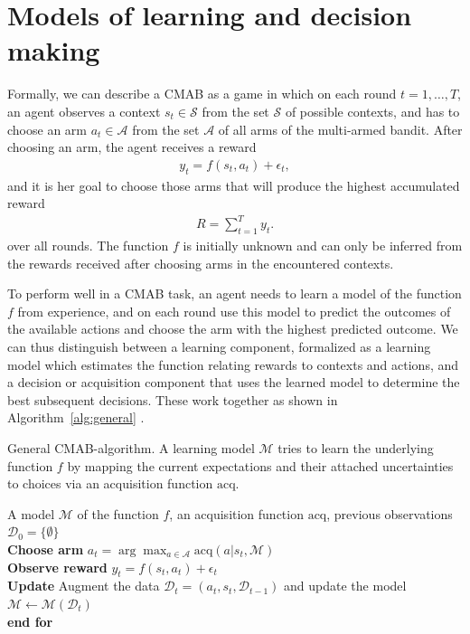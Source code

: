 \documentclass[a4paper,natbib]{apa6}
\begin{document}
\section{Models of learning and decision making}

Formally, we can describe a CMAB as a game in which on each round $t=1,\ldots,T$, an agent observes a context $s_t \in \mathcal{S}$ from the set $\mathcal{S}$ of possible contexts, and has to choose an arm $a_t \in \mathcal{A}$ from the set $\mathcal{A}$ of all arms of the multi-armed bandit. After choosing an arm, the agent receives a reward 
\begin{align}
y_t=f(s_t,a_t)+\epsilon_t ,
\end{align}
and it is her goal to choose those arms that will produce the highest accumulated reward 
\begin{align}
R = \sum_{t=1}^T y_t .
\end{align}
over all rounds. The function $f$ is initially unknown and can only be inferred from the rewards received after choosing arms in the encountered contexts.

To perform well in a CMAB task, an agent needs to learn a model of the function $f$ from experience, and on each round use this model to predict the outcomes of the available actions and choose the arm with the highest predicted outcome. We can thus distinguish between a learning component, formalized as a learning model which estimates the function relating rewards to contexts and actions, and a decision or acquisition component that uses the learned model to determine the best subsequent decisions. These work together as shown in Algorithm~\ref{alg:general} \citep[see also][]{brochu2010tutorial}.

\FloatBarrier
\begin{algorithm}
\caption{General CMAB-algorithm. A learning model $\mathcal{M}$ tries to learn the underlying function $f$ by mapping the current expectations and their attached uncertainties to choices via an acquisition function $\text{acq}$.}
\label{alg:general}
\begin{algorithmic}
\Require 
A model $\mathcal{M}$ of the function $f$, an acquisition function $\text{acq}$, previous observations $\mathcal{D}_0 = \{\emptyset\}$
\\
\hspace{5mm}\textbf{Choose arm} $a_t = \arg \max_{a \in \mathcal{A}} \text{acq} \left(a | s_t, \mathcal{M} \right)$ \\ %
\hspace{5mm}\textbf{Observe reward} $y_t=f(s_t,a_t)+\epsilon_t$\\
\hspace{5mm}\textbf{Update} Augment the data $\mathcal{D}_t = (a_{t},s_{t},\mathcal{D}_{t-1})$ and update the model $\mathcal{M} \leftarrow \mathcal{M}(\mathcal{D}_t)$ \\
\textbf{end for}
\EndFor
\end{algorithmic}
\end{algorithm}
\FloatBarrier
\end{document}
